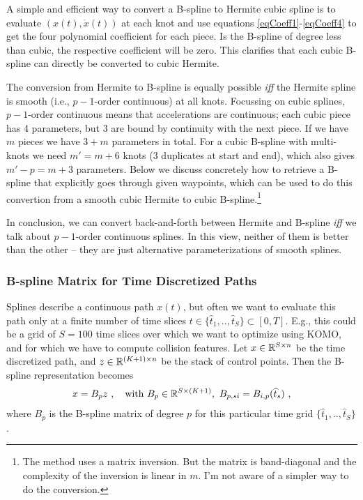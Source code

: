 A simple and efficient way to convert a B-spline to Hermite cubic
spline is to evaluate $(x(t),\dot x(t))$ at each knot and use
equations \eqref{eqCoeff1}-\eqref{eqCoeff4} to get the four polynomial
coefficient for each piece. Is the B-spline of degree less than
cubic, the respective coefficient will be zero. This clarifies that
each cubic B-spline can directly be converted to cubic Hermite.

The conversion from Hermite to B-spline is equally possible \emph{iff}
the Hermite spline is smooth (i.e., $p-1$-order continuous) at all
knots. Focussing on cubic splines, $p-1$-order continuous means that
accelerations are continuous; each cubic piece has 4 parameters, but 3
are bound by continuity with the next piece. If we have $m$ pieces we
have $3+m$ parameters in total. For a cubic B-spline with multi-knots
we need $m' = m+6$ knots (3 duplicates at start and end), which also
gives $m'-p = m+3$ parameters. Below we discuss concretely how to
retrieve a B-spline that explicitly goes through given waypoints,
which can be used to do this convertion from a smooth cubic Hermite to
cubic B-spline.\footnote{The method uses a matrix inversion. But the
matrix is band-diagonal and the complexity of the inversion is linear
in $m$. I'm not aware of a simpler way to do the conversion.}

In conclusion, we can convert back-and-forth between Hermite and
B-spline \emph{iff} we talk about $p-1$-order continuous splines. In
this view, neither of them is better than the other -- they are just
alternative parameterizations of smooth splines.



\subsubsection{B-spline Matrix for Time Discretized Paths}

Splines describe a continuous path $x(t)$, but often we want to
evaluate this path only at a finite number of time slices $t\in \{\hat
t_1,..,\hat t_S\} \subset [0,T]$. E.g., this could be a grid of
$S=100$ time slices over which we want to optimize using KOMO, and for
which we have to compute collision features. Let $x \in {\mathbb{R}}^{S \times
n}$ be the time discretized path, and $z \in{\mathbb{R}}^{(K{{\hspace*{-.0pt}\text{\rm +}\hspace*{-.5pt}}1})\times n}$ be
the stack of control points. Then the B-spline representation becomes
\begin{align}
x = B_p z ~,\quad \text{with } B_p\in{\mathbb{R}}^{S\times (K{{\hspace*{-.0pt}\text{\rm +}\hspace*{-.5pt}}1})},~ B_{p,si} = B_{i,p}(\widehat t_s) ~,
\end{align}
where $B_p$ is the B-spline matrix of degree $p$ for this particular time grid $\{\hat t_1,..,\hat t_S\}$.


